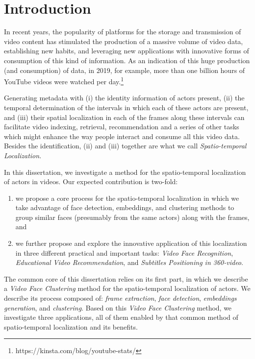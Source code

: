 \newpage

\chapter{Introduction}
\label{chap:introduction}

In recent years, the popularity of platforms for the storage and transmission of video content has stimulated the production of a massive volume of video data, establishing new habits, and leveraging new applications with innovative forms of consumption of this kind of information. As an indication of this huge production (and consumption) of data, in 2019, for example, more than one billion hours of YouTube videos were watched per day.\footnote{https://kinsta.com/blog/youtube-stats/}


Generating metadata with (i) the identity information of actors present, (ii) the temporal determination of the intervals in which each of these actors are present, and (iii) their spatial localization in each of the frames along these intervals can facilitate video indexing, retrieval, recommendation and a series of other tasks which might enhance the way people interact and consume all this video data. Besides the identification, (ii) and (iii) together are what we call \textit{Spatio-temporal Localization}. 

In this dissertation, we investigate a method for the spatio-temporal localization of actors in videos. Our expected contribution is two-fold: 
\begin{enumerate}
\item we propose a core process for the spatio-temporal localization in which we take advantage of face detection, embeddings, and clustering methods to group similar faces (presumably from the same actors) along with the frames, and \item we further propose and explore the innovative application of this localization in three different practical and important tasks: \emph{Video Face Recognition}, \emph{Educational Video Recommendation}, and \emph{Subtitles Positioning in 360-video}.  
\end{enumerate}

The common core of this dissertation relies on its first part, in which we describe a \textit{Video Face Clustering} method for the spatio-temporal localization of actors. We describe its process composed of: \textit{frame extraction}, \textit{face detection}, \textit{embeddings generation}, and \textit{clustering}. 
Based on this \emph{Video Face Clustering} method, we investigate three applications, all of them enabled by that common method of spatio-temporal localization and its benefits. 

